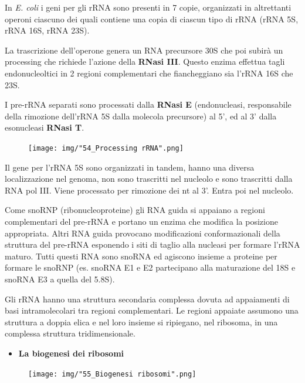 \documentclass[11pt]{book}
\begin{document}
In \emph{E. coli} i geni per gli rRNA sono presenti in 7 copie,
organizzati in altrettanti operoni ciascuno dei quali contiene una copia
di ciascun tipo di rRNA (rRNA 5S, rRNA 16S, rRNA 23S).

La trascrizione dell'operone genera un RNA precursore 30S che poi subirà
un processing che richiede l'azione della \textbf{RNasi III}. Questo
enzima effettua tagli endonucleoltici in 2 regioni complementari che
fiancheggiano sia l'rRNA 16S che 23S.

I pre-rRNA separati sono processati dalla \textbf{RNasi E}
(endonucleasi, responsabile della rimozione dell'rRNA 5S dalla molecola
precursore) al 5', ed al 3' dalla esonucleasi \textbf{RNasi T}.

\begin{figure}[htp]
\centering
\texttt{[image: img/"54\_Processing rRNA".png]}
\caption{}
\label{processing-rrna}
\end{figure}

Il gene per l'rRNA 5S sono organizzati in tandem, hanno una diversa
localizzazione nel genoma, non sono trascritti nel nucleolo e sono
trascritti dalla RNA pol III. Viene processato per rimozione dei nt al
3'. Entra poi nel nucleolo.

Come snoRNP (ribonucleoproteine) gli RNA guida si appaiano a regioni
complementari del pre-rRNA e portano un enzima che modifica la posizione
appropriata. Altri RNA guida provocano modificazioni conformazionali
della struttura del pre-rRNA esponendo i siti di taglio alla nucleasi
per formare l'rRNA maturo. Tutti questi RNA sono snoRNA ed agiscono
insieme a proteine per formare le snoRNP (es. snoRNA E1 e E2 partecipano
alla maturazione del 18S e snoRNA E3 a quella del 5.8S).

Gli rRNA hanno una struttura secondaria complessa dovuta ad appaiamenti
di basi intramolecolari tra regioni complementari. Le regioni appaiate
assumono una struttura a doppia elica e nel loro insieme si ripiegano,
nel ribosoma, in una complessa struttura tridimensionale.

\begin{itemize}
\itemsep1pt\parskip0pt
\item
  \textbf{La biogenesi dei ribosomi}
\end{itemize}

\begin{figure}[htp]
\centering
\texttt{[image: img/"55\_Biogenesi ribosomi".png]}
\caption{}
\label{biogenesi-ribosomi}
\end{figure}
\end{document}
